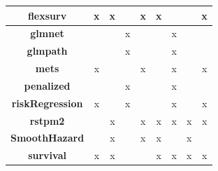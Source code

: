 \documentclass[
]{jss}
\begin{document}
\begin{table}[ht]
{\begin{tabular}{ccccccccc}
\textbf{flexsurv}        & x                        & x                         &                       & x                & x                   &                          &                                  & x               \\ \bottomrule
\textbf{glmnet}          &                          &                           & x                     &                  &                     & x                        &                                  &                                  \\ \bottomrule
\textbf{glmpath}         &                          &                           & x                     &                  &                     & x                        &                                  &                                  \\ \bottomrule
\textbf{mets}            & x                        &                           &                       & x                &                     & x                        &                                  & x                                \\ \bottomrule
\textbf{penalized}       &                          &                           & x                     &                  &                     & x                        &                                  &                                  \\ \bottomrule
\textbf{riskRegression}  & x                         &                           & x                     &                  &                     & x                        &                                  & x                                \\ \bottomrule
\textbf{rstpm2}          &                          & x                         &                      & x                & x                   & x                        & x                                & x                         \\ \bottomrule
\textbf{SmoothHazard}    &                          & x                         &                       & x                & x                   &                          & x                            &                                      \\ \bottomrule
\textbf{survival}        & x                        & x                         &                       &                  & x                   & x                        & x                                & x                               \\ \bottomrule

\end{tabular}}
\end{table}
\end{document}
